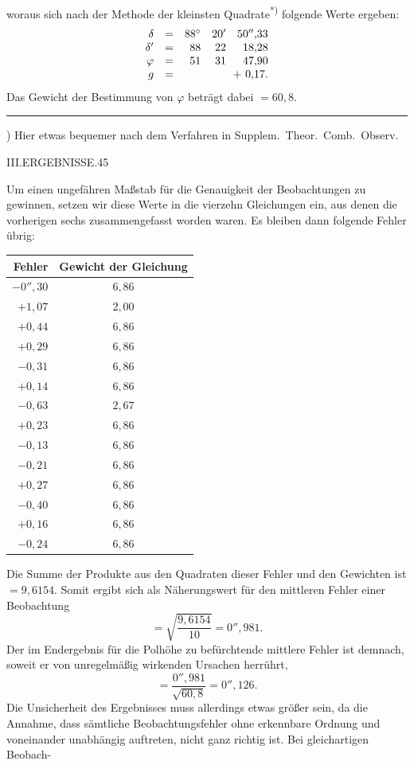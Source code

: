 woraus sich nach der Methode der kleinsten Quadrate\textsuperscript{*)} folgende Werte ergeben:
\[
\begin{array}{rcrrr}
\delta&=&88^\circ&20'&50''{,}33\\
\delta'&=&88&22&18{,}28\\
\varphi&=&51&31&47{,}90\\
g&=&\multicolumn{3}{r}{+\ 0{,}17.}
\end{array}
\]
Das Gewicht der Bestimmung von $\varphi$ beträgt dabei $=60{,}8$.
\par\noindent\rule{.25\textwidth}{.4pt}\par
{\footnotesize *) Hier etwas bequemer nach dem Verfahren in Supplem.\ Theor.\ Comb.\ Observ.\par}

\clearpage
\noindent\mbox{}\hfill III.\quad ERGEBNISSE.\hfill 45\par
Um einen ungefähren Maßstab für die Genauigkeit der Beobachtungen zu gewinnen, setzen wir diese Werte in die vierzehn Gleichungen ein, aus denen die vorherigen sechs zusammengefasst worden waren. Es bleiben dann folgende Fehler übrig:
\begin{center}
\begin{tabular}{r|c}
Fehler&Gewicht der Gleichung\\\hline
$-0''{,}30$&$6{,}86$\\
$+1{,}07$&$2{,}00$\\
$+0{,}44$&$6{,}86$\\
$+0{,}29$&$6{,}86$\\
$-0{,}31$&$6{,}86$\\
$+0{,}14$&$6{,}86$\\
$-0{,}63$&$2{,}67$\\
$+0{,}23$&$6{,}86$\\
$-0{,}13$&$6{,}86$\\
$-0{,}21$&$6{,}86$\\
$+0{,}27$&$6{,}86$\\
$-0{,}40$&$6{,}86$\\
$+0{,}16$&$6{,}86$\\
$-0{,}24$&$6{,}86$
\end{tabular}
\end{center}
Die Summe der Produkte aus den Quadraten dieser Fehler und den Gewichten ist $=9{,}6154$. Somit ergibt sich als Näherungswert für den mittleren Fehler einer Beobachtung
\[
=\sqrt{\frac{9{,}6154}{10}}=0''{,}981.
\]
Der im Endergebnis für die Polhöhe zu befürchtende mittlere Fehler ist demnach, soweit er von unregelmäßig wirkenden Ursachen herrührt,
\[
=\frac{0''{,}981}{\sqrt{60{,}8}}=0''{,}126.
\]
Die Unsicherheit des Ergebnisses muss allerdings etwas größer sein, da die Annahme, dass sämtliche Beobachtungsfehler ohne erkennbare Ordnung und voneinander unabhängig auftreten, nicht ganz richtig ist. Bei gleichartigen Beobach-

